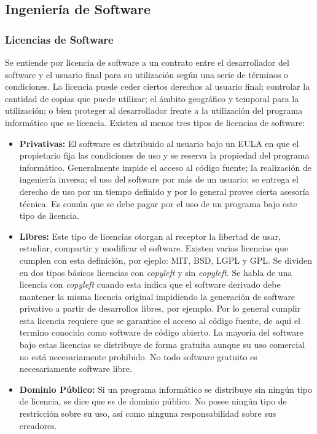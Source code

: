 \documentclass[11pt,letterpaper]{article}
\begin{document}


\subsection{Ingeniería de Software}

\subsubsection{Licencias de Software}
Se entiende por licencia de software a un contrato entre el desarrollador del software y el usuario final para su utilización según una serie de términos o condiciones. La licencia puede ceder ciertos derechos al usuario final; controlar la cantidad de copias que puede utilizar; el ámbito geográfico y temporal para la utilización; o bien proteger al desarrollador frente a la utilización del programa informático que se licencia. Existen al menos tres tipos de licencias de software:

\begin{itemize}
	\item \textbf{Privativas:}  El software es distribuido al usuario bajo un \ac{EULA} en que el propietario fija las condiciones de uso y se reserva la propiedad del programa informático. Generalmente impide el acceso al código fuente; la realización de ingeniería inversa; el uso del software por más de un usuario; se entrega el derecho de uso por un tiempo definido y por lo general provee cierta asesoría técnica. Es común que se debe pagar por el uso de un programa bajo este tipo de licencia.
	
	\item \textbf{Libres:} Este tipo de licencias otorgan al receptor la libertad de usar, estudiar, compartir y modificar el software. Existen varias licencias que cumplen con esta definición, por ejeplo: MIT, BSD, \ac{LGPL} y \ac{GPL}. Se dividen en dos tipos básicos licencias con \textit{copyleft} y sin \textit{copyleft}. Se habla de una licencia con \textit{copyleft} cuando esta indica que el software derivado debe mantener la misma licencia original impidiendo la generación de software privativo a partir de desarrollos libres, por ejemplo. Por lo general cumplir esta licencia requiere que se garantice el acceso al código fuente, de aquí el termino conocido como software de código abierto. La mayoría del software bajo estas licencias se distribuye de forma gratuita aunque su uso comercial no está necesariamente prohibido. No todo software gratuito es necesariamente software libre.
	
	\item \textbf{Dominio Público:} Si un programa informático se distribuye sin ningún tipo de licencia, se dice que es de dominio público. No posee ningún tipo de restricción sobre su uso, así como ninguna responsabilidad sobre sus creadores.
\end{itemize}
\end{document}
